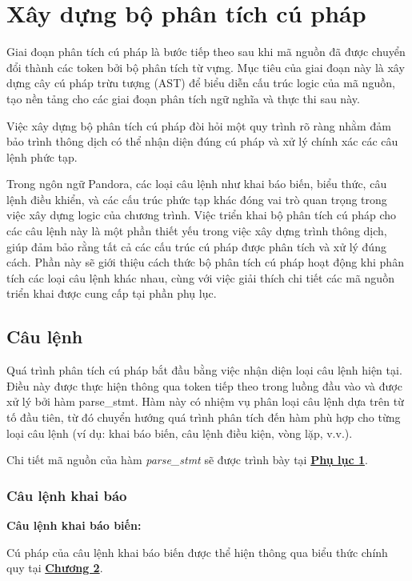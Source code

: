 \section{Xây dựng bộ phân tích cú pháp}
\label{ch3:syntax-analysis}
Giai đoạn phân tích cú pháp là bước tiếp theo sau khi mã nguồn đã được chuyển đổi thành các token bởi bộ phân tích từ vựng. Mục tiêu của giai đoạn này là xây dựng cây cú pháp trừu tượng (AST) để biểu diễn cấu trúc logic của mã nguồn, tạo nền tảng cho các giai đoạn phân tích ngữ nghĩa và thực thi sau này. 

Việc xây dựng bộ phân tích cú pháp đòi hỏi một quy trình rõ ràng nhằm đảm bảo trình thông dịch có thể nhận diện đúng cú pháp và xử lý chính xác các câu lệnh phức tạp.

Trong ngôn ngữ Pandora, các loại câu lệnh như khai báo biến, biểu thức, câu lệnh điều khiển, và các cấu trúc phức tạp khác đóng vai trò quan trọng trong việc xây dựng logic của chương trình. Việc triển khai bộ phân tích cú pháp cho các câu lệnh này là một phần thiết yếu trong việc xây dựng trình thông dịch, giúp đảm bảo rằng tất cả các cấu trúc cú pháp được phân tích và xử lý đúng cách. Phần này sẽ giới thiệu cách thức bộ phân tích cú pháp hoạt động khi phân tích các loại câu lệnh khác nhau, cùng với việc giải thích chi tiết các mã nguồn triển khai được cung cấp tại phần phụ lục.

\subsection{Câu lệnh}
Quá trình phân tích cú pháp bắt đầu bằng việc nhận diện loại câu lệnh hiện tại. Điều này được thực hiện thông qua token tiếp theo trong luồng đầu vào và được xử lý bởi hàm parse\_stmt. Hàm này có nhiệm vụ phân loại câu lệnh dựa trên từ tố đầu tiên, từ đó chuyển hướng quá trình phân tích đến hàm phù hợp cho từng loại câu lệnh (ví dụ: khai báo biến, câu lệnh điều kiện, vòng lặp, v.v.).

Chi tiết mã nguồn của hàm \textit{parse\_stmt} sẽ được trình bày tại \hyperref[ap1:stmt]{\bf Phụ lục 1}. %


\subsubsection{Câu lệnh khai báo}

\textbf{Câu lệnh khai báo biến:}

Cú pháp của câu lệnh khai báo biến được thể hiện thông qua biểu thức chính quy tại \hyperref[ch2:decl_var_stmt]{\bf Chương 2}.

